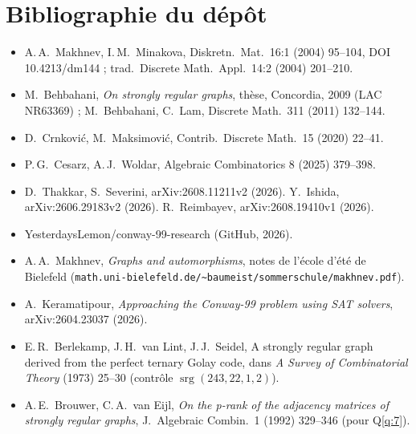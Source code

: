 \documentclass[11pt,a4paper]{article}
\theoremstyle{definition}
\theoremstyle{remark}
\newcommand{\srg}{\operatorname{srg}}
\newcommand{\code}[1]{\texttt{#1}}
\begin{document}
\section{Bibliographie du dépôt}
\begin{itemize}[nosep]
\item A.\,A.~Makhnev, I.\,M.~Minakova, Diskretn.\ Mat.\ 16:1 (2004) 95--104, DOI 10.4213/dm144 ; trad.\ Discrete Math.\ Appl.\ 14:2 (2004) 201--210.
\item M.~Behbahani, \emph{On strongly regular graphs}, thèse, Concordia, 2009 (LAC NR63369) ; M.~Behbahani, C.~Lam, Discrete Math.\ 311 (2011) 132--144.
\item D.~Crnković, M.~Maksimović, Contrib.\ Discrete Math.\ 15 (2020) 22--41.
\item P.\,G.~Cesarz, A.\,J.~Woldar, Algebraic Combinatorics 8 (2025) 379--398.
\item D.~Thakkar, S.~Severini, arXiv:2608.11211v2 (2026). Y.~Ishida, arXiv:2606.29183v2 (2026). R.~Reimbayev, arXiv:2608.19410v1 (2026).
\item YesterdaysLemon/conway-99-research (GitHub, 2026).
\item A.\,A.~Makhnev, \emph{Graphs and automorphisms}, notes de l'école d'été de Bielefeld (\code{math.uni-bielefeld.de/\textasciitilde baumeist/sommerschule/makhnev.pdf}).
\item A.~Keramatipour, \emph{Approaching the Conway-99 problem using SAT solvers}, arXiv:2604.23037 (2026).
\item E.\,R.~Berlekamp, J.\,H.~van Lint, J.\,J.~Seidel, A strongly regular graph derived from the perfect ternary Golay code, dans \emph{A Survey of Combinatorial Theory} (1973) 25--30 (contrôle $\srg(243,22,1,2)$).
\item A.\,E.~Brouwer, C.\,A.~van Eijl, \emph{On the p-rank of the adjacency matrices of strongly regular graphs}, J.\ Algebraic Combin.\ 1 (1992) 329--346 (pour Q\ref{q:7}).
\end{itemize}
\end{document}
